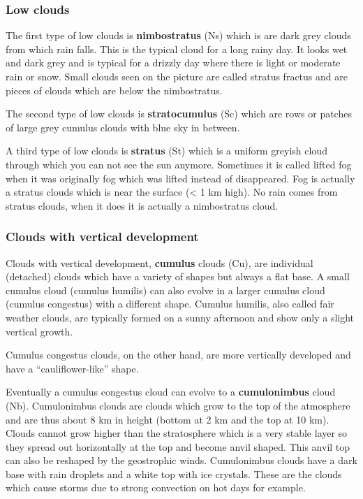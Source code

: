 \documentclass[oneside]{book}
\begin{document}
\subsubsection{Low clouds}\label{low-clouds}

The first type of low clouds is \textbf{nimbostratus} (Ns) which is are
dark grey clouds from which rain falls. This is the typical cloud for a
long rainy day. It looks wet and dark grey and is typical for a drizzly
day where there is light or moderate rain or snow. Small clouds seen on
the picture are called stratus fractus and are pieces of clouds which
are below the nimbostratus.

The second type of low clouds is \textbf{stratocumulus} (Sc) which are
rows or patches of large grey cumulus clouds with blue sky in between.

A third type of low clouds is \textbf{stratus} (St) which is a uniform
greyish cloud through which you can not see the sun anymore. Sometimes
it is called lifted fog when it was originally fog which was lifted
instead of disappeared. Fog is actually a stratus clouds which is near
the surface (\textless{} 1 km high). No rain comes from stratus clouds,
when it does it is actually a nimbostratus cloud.

\subsubsection{Clouds with vertical
development}\label{clouds-with-vertical-development}

Clouds with vertical development, \textbf{cumulus} clouds (Cu), are
individual (detached) clouds which have a variety of shapes but always a
flat base. A small cumulus cloud (cumulus humilis) can also evolve in a
larger cumulus cloud (cumulus congestus) with a different shape. Cumulus
humilis, also called fair weather clouds, are typically formed on a
sunny afternoon and show only a slight vertical growth.

Cumulus congestus clouds, on the other hand, are more vertically
developed and have a ``cauliflower-like'' shape.

Eventually a cumulus congestus cloud can evolve to a
\textbf{cumulonimbus} cloud (Nb). Cumulonimbus clouds are clouds which
grow to the top of the atmosphere and are thus about 8 km in height
(bottom at 2 km and the top at 10 km). Clouds cannot grow higher than
the stratosphere which is a very stable layer so they spread out
horizontally at the top and become anvil shaped. This anvil top can also
be reshaped by the geostrophic winds. Cumulonimbus clouds have a dark
base with rain droplets and a white top with ice crystals. These are the
clouds which cause storms due to strong convection on hot days for
example.
\end{document}
